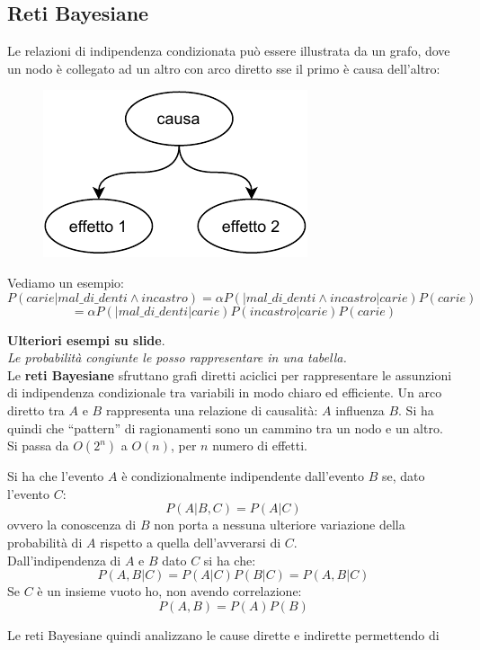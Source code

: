 \message{ !name(modprob.tex)}\documentclass[a4paper,12pt, oneside]{book}
\begin{document}
\subsection{Reti Bayesiane}
Le relazioni di indipendenza condizionata può essere illustrata da un grafo,
dove un nodo è collegato ad un altro con arco diretto sse il primo è causa
dell'altro:
\begin{figure}[H]
  \centering
  \includegraphics[scale = 0.9]{img/b.pdf}
\end{figure}
\begin{esempio}
  Vediamo un esempio:
  \[P(carie|mal\_di\_denti\land incastro)=\alpha P(|mal\_di\_denti\land
    incastro|carie)P(carie)\]
  \[=\alpha P(|mal\_di\_denti|carie)P(incastro|carie)P(carie)\]
\end{esempio}
\textbf{Ulteriori esempi su slide}.\\
\textit{Le probabilità congiunte le posso rappresentare in una tabella.}\\
Le \textbf{reti Bayesiane} sfruttano grafi diretti aciclici per rappresentare le
assunzioni di indipendenza condizionale tra variabili in modo chiaro ed
efficiente. Un arco diretto tra $A$ e $B$ rappresenta una relazione di
causalità: $A$ influenza $B$. Si ha quindi che ``pattern'' di ragionamenti sono
un cammino tra un nodo e un altro.\\
Si passa da $O(2^n)$ a $O(n)$, per $n$ numero di effetti.
\begin{definizione}
  Si ha che l'evento $A$ è condizionalmente indipendente dall'evento $B$ se,
  dato l'evento $C$:
  \[P(A|B,C)=P(A|C)\]
  ovvero la conoscenza di $B$ non porta a nessuna ulteriore variazione della
  probabilità di $A$ rispetto a quella dell'avverarsi di $C$. \\
  Dall'indipendenza di $A$ e $B$ dato $C$ si ha che:
  \[P(A,B|C)=P(A|C)P(B|C)=P(A,B|C)\]
  Se $C$ è un insieme vuoto ho, non avendo correlazione:
  \[P(A,B)=P(A)P(B)\]
\end{definizione}
Le reti Bayesiane quindi analizzano le cause dirette e indirette permettendo di
\end{document}
